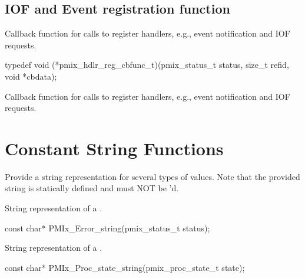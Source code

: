 \subsection{IOF and Event registration function}

\summary

Callback function for calls to register handlers, e.g., event notification and IOF requests.

\format

\cspecificstart
\begin{codepar}
typedef void (*pmix_hdlr_reg_cbfunc_t)(pmix_status_t status,
                                       size_t refid,
                                       void *cbdata);
\end{codepar}
\cspecificend

\begin{arglist}
\end{arglist}

\descr

Callback function for calls to register handlers, e.g., event notification and IOF requests.


\section{Constant String Functions}

Provide a string representation for several types of values.
Note that the provided string is statically defined and must NOT be 'd.

\summary
{}

String representation of a .

\cspecificstart
\begin{codepar}
const char*
PMIx_Error_string(pmix_status_t status);
\end{codepar}
\cspecificend

\summary
{}

String representation of a .

\cspecificstart
\begin{codepar}
const char*
PMIx_Proc_state_string(pmix_proc_state_t state);
\end{codepar}
\cspecificend

